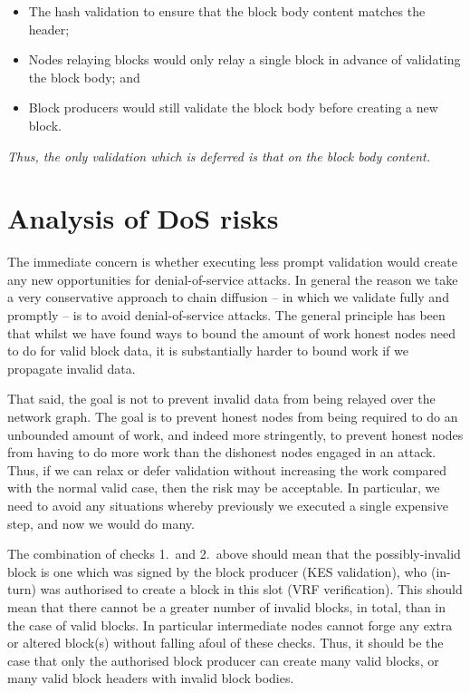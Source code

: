 \documentclass[11pt,a4paper]{article}
\begin{document}
\begin{itemize} 
  \item The hash validation to ensure that the block body content matches the header;
  \item Nodes relaying blocks would only relay a single block in advance of validating the block body; and
  \item Block producers would still validate the block body before creating a new block.
\end{itemize}

\emph{Thus, the only validation which is deferred is that on the block body content.}

\section{Analysis of DoS risks}
The immediate concern is whether executing less prompt validation would
create any new opportunities for denial-of-service attacks. In general the reason
we take a very conservative approach to chain diffusion -- in which we validate
fully and promptly -- is to avoid denial-of-service attacks. The general
principle has been that whilst we have found ways to bound the amount of work
honest nodes need to do for valid block data, it is substantially harder to
bound work if we propagate invalid data.

That said, the goal is not to prevent invalid data from being relayed over the
network graph. The goal is to prevent honest nodes from being required to do an
unbounded amount of work, and indeed more stringently, to prevent honest nodes
from having to do more work than the dishonest nodes engaged in an attack. Thus,
if we can relax or defer validation without increasing the work compared with the
normal valid case, then the risk may be acceptable. In particular, we need to avoid any
situations whereby previously we executed a single expensive step, and now we would do many.

The combination of checks 1.~and 2.~above should mean that the possibly-invalid
block is one which was signed by the block producer (KES validation), who (in-turn) was
authorised to create a block in this slot (VRF verification). This should mean that
there cannot be a greater number of invalid blocks, in total, than in the case of valid blocks. In
particular intermediate nodes cannot forge any extra or altered block(s) without
falling afoul of these checks. Thus, it should be the case that only the
authorised block producer can create many valid blocks, or many valid block
headers with invalid block bodies.
\end{document}
